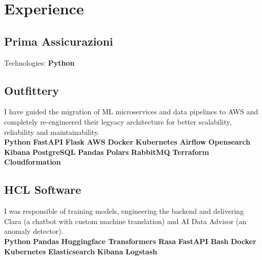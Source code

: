 \documentclass[]{deedy-resume-openfont}
\begin{document}
\begin{minipage}[t]{0.66\textwidth} 


\section{Experience}

\subsection{Prima Assicurazioni}
Technologies: \textbf{Python}
\sectionsep

\subsection{Outfittery}
I have guided the migration of ML microservices and data pipelines to AWS and completely re-engineered their legyacy architecture for better scalability, reliability and maintainability. \\
\textbf{Python} \textbullet{} \textbf{FastAPI} \textbullet{} \textbf{Flask} \textbullet{} \textbf{AWS} \textbullet{} \textbf{Docker} \textbullet{} \textbf{Kubernetes} \textbullet{} \textbf{Airflow} \textbullet{} \textbf{Opensearch} \textbullet{} \textbf{Kibana} \textbf{PostgreSQL} \textbullet{} \textbf{Pandas} \textbullet{} \textbf{Polars} \textbullet{} \textbf{RabbitMQ} \textbullet{} \textbf{Terraform} \textbullet{} \textbf{Cloudformation}
\sectionsep

\subsection{HCL Software}
I was responsible of training models, engineering the backend and delivering Clara (a chatbot with custom machine translation) and AI Data Advisor (an anomaly detector). \\
\textbf{Python} \textbullet{} \textbf{Pandas} \textbullet{} \textbf{Huggingface Transformers} \textbullet{} \textbf{Rasa} \textbullet{} \textbf{FastAPI} \textbullet{} \textbf{Bash} \textbullet{} \textbf{Docker} \textbullet{} \textbf{Kubernetes} \textbullet{} \textbf{Elasticsearch} \textbullet{} \textbf{Kibana} \textbullet{} \textbf{Logstash}
\sectionsep


\end{minipage}
\end{document}
